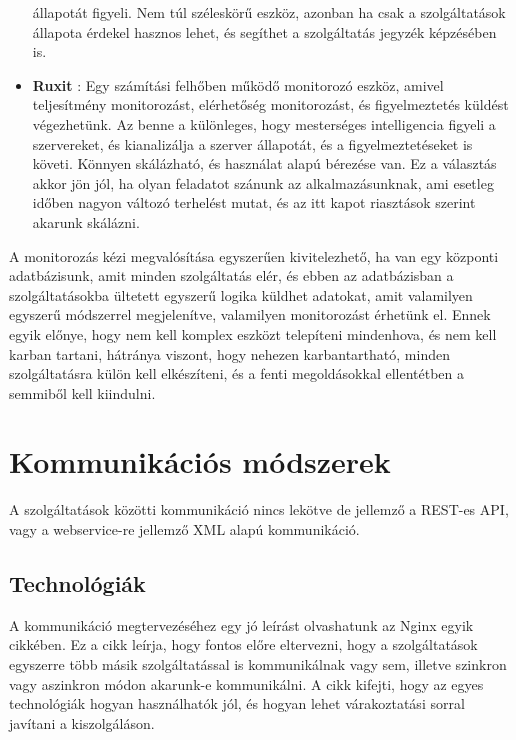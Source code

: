 \documentclass[11pt,magyar,a4paper,twoside,]{report}
\begin{document}
\begin{itemize}
  állapotát figyeli. Nem túl széleskörű eszköz, azonban ha csak a
  szolgáltatások állapota érdekel hasznos lehet, és segíthet a
  szolgáltatás jegyzék képzésében is.
\item
  \textbf{Ruxit}\citep{ruxit-overview} \citep{ruxit-monitoring}: Egy
  számítási felhőben működő monitorozó eszköz, amivel teljesítmény
  monitorozást, elérhetőség monitorozást, és figyelmeztetés küldést
  végezhetünk. Az benne a különleges, hogy mesterséges intelligencia
  figyeli a szervereket, és kianalizálja a szerver állapotát, és a
  figyelmeztetéseket is követi. Könnyen skálázható, és használat alapú
  bérezése van. Ez a választás akkor jön jól, ha olyan feladatot szánunk
  az alkalmazásunknak, ami esetleg időben nagyon változó terhelést
  mutat, és az itt kapot riasztások szerint akarunk skálázni.
\end{itemize}

A monitorozás kézi megvalósítása egyszerűen kivitelezhető, ha van egy
központi adatbázisunk, amit minden szolgáltatás elér, és ebben az
adatbázisban a szolgáltatásokba ültetett egyszerű logika küldhet
adatokat, amit valamilyen egyszerű módszerrel megjelenítve, valamilyen
monitorozást érhetünk el. Ennek egyik előnye, hogy nem kell komplex
eszközt telepíteni mindenhova, és nem kell karban tartani, hátránya
viszont, hogy nehezen karbantartható, minden szolgáltatásra külön kell
elkészíteni, és a fenti megoldásokkal ellentétben a semmiből kell
kiindulni.

\section{Kommunikációs
módszerek}\label{kommunikuxe1ciuxf3s-muxf3dszerek}

A szolgáltatások közötti kommunikáció nincs lekötve de jellemző a
REST-es API, vagy a webservice-re jellemző XML alapú
kommunikáció\citep{rest-soap}.

\subsection{Technológiák}\label{technoluxf3giuxe1k}

A kommunikáció megtervezéséhez egy jó leírást olvashatunk az Nginx egyik
cikkében\citep{micro-communication}. Ez a cikk leírja, hogy fontos előre
eltervezni, hogy a szolgáltatások egyszerre több másik szolgáltatással
is kommunikálnak vagy sem, illetve szinkron vagy aszinkron módon
akarunk-e kommunikálni. A cikk kifejti, hogy az egyes technológiák
hogyan használhatók jól, és hogyan lehet várakoztatási sorral javítani a
kiszolgáláson.
\end{document}
